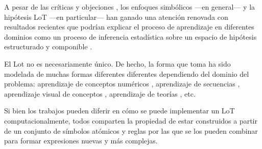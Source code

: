 
A pesar de las críticas y objeciones \cite{blackburn1984spreading,loewer1991meaning,knowles1998language,aydede1997language}, los enfoques simbólicos ---en general--- y la hipótesis LoT ---en particular--- han ganado una atención renovada con resultados recientes que podrían explicar el proceso de aprendizaje en diferentes dominios como un proceso de inferencia estadística sobre un espacio de hipótesis estructurado y componible \cite{tenenbaum2011grow,piantadosi2016four}.


El Lot no es necesariamente único. De hecho, la forma que toma ha sido modelada de muchas formas diferentes diferentes dependiendo del dominio del problema: aprendizaje de conceptos numéricos \cite{piantadosi2012bootstrapping}, aprendizaje de secuencias \cite{amalric2017language,yildirim2015learning,romano2013language}, aprendizaje visual de conceptos \cite{ellis2015unsupervised}, aprendizaje de teorías \cite{ullman2012theory}, etc.


Si bien los trabajos pueden diferir en cómo se puede implementar un LoT computacionalmente, todos comparten la propiedad de estar construidos a partir de un conjunto de símbolos atómicos y reglas por las que se los pueden combinar para formar expresiones nuevas y más complejas.


